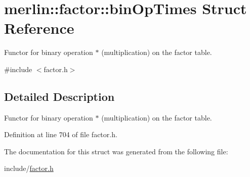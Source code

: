 \hypertarget{structmerlin_1_1factor_1_1binOpTimes}{}\section{merlin\+:\+:factor\+:\+:bin\+Op\+Times Struct Reference}
\label{structmerlin_1_1factor_1_1binOpTimes}


Functor for binary operation $\ast$ (multiplication) on the factor table.  




{\ttfamily \#include $<$factor.\+h$>$}



\subsection{Detailed Description}
Functor for binary operation $\ast$ (multiplication) on the factor table. 

Definition at line 704 of file factor.\+h.



The documentation for this struct was generated from the following file\+:\begin{DoxyCompactItemize}
\item 
include/\hyperlink{factor_8h}{factor.\+h}\end{DoxyCompactItemize}
